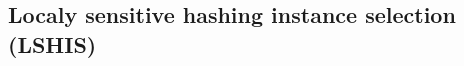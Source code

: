 \begin{comment}
Podemos clasificar estos algoritmos de acuerdo al tipo de instancias que eliminemos ~\cite{Garcia2012}. Así pues, podemos distinguir entre:

\begin{itemize}
	\item \textbf{Algoritmos de condensación:} Se concentra en mantener las instancias cercanas a las fronteras de decisión entre las clases.
	\item \textbf{Algoritmos de edición:} Eliminan instancias ruidosas así como aquellas que se encuentran muy cerca de la frontera de decisión, intentando mejorar la calidad del conjunto y produciendo una frontera entre clases mucho más suave.
	\item \textbf{Algoritmos híbridos:} Intentan encontrar el subconjunto de instancias más pequeño posible que mantenga o incluso mejore el resultado que más tarde conseguirá el algoritmo de minería de datos que apliquemos. Para ello permite eliminar cualquier tipo de instancias. 
\end{itemize}

De la misma manera, según la forma en la que se construya el nuevo conjunto de datos podemos diferenciar entre las siguientes clases de algoritmos~\cite{Garcia2011}:

\begin{itemize}
	\item \textbf{De incremento:} Partimos de un conjunto vacío o con unas pocas instancias significativas y añadimos nuevas instancias con cada iteración del algoritmo.
	\item \textbf{De decremento:} Comenzamos con todas las instancias y mediante operaciones de eliminación conseguimos un nuevo conjunto de tamaño menor.
	\item \textbf{Fijos:} Desde el principio el usuario indica el número final de instancias al que queremos reducir un conjunto. Son algoritmos muy dependientes del conjunto de datos utilizado. 
	\item \textbf{Mixto:} Comenzamos con un subconjunto de instancias, obtenidas de manera aleatoria o tras aplicar otro algoritmo de selección, y realizamos operaciones para añadir o eliminar instancias de ese dicho conjunto.
\end{itemize}

\end{comment}

\subsection{Localy sensitive hashing instance selection (LSHIS)}\label{sec:defLSHIS}

